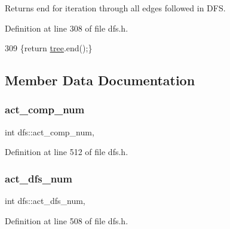 \begin{DoxyReturn}{Returns}
end for iteration through all edges followed in D\+FS. 
\end{DoxyReturn}


Definition at line 308 of file dfs.\+h.


\begin{DoxyCode}
309     \{\textcolor{keywordflow}{return} \mbox{\hyperlink{classdfs_aed496b618a937723bfec0b463e17e8d5}{tree}}.end();\}
\end{DoxyCode}


\subsection{Member Data Documentation}
\mbox{\label{classdfs_ab0251ac30adfd569e214a64db7f3a905}} 
\subsubsection{\texorpdfstring{act\+\_\+comp\+\_\+num}{act\_comp\_num}}
{\footnotesize\ttfamily int dfs\+::act\+\_\+comp\+\_\+num\hspace{0.3cm}{\ttfamily [protected]}, {\ttfamily [inherited]}}



Definition at line 512 of file dfs.\+h.

\mbox{\label{classdfs_aedaf2b485ff83150b1de6c305922473b}} 
\subsubsection{\texorpdfstring{act\+\_\+dfs\+\_\+num}{act\_dfs\_num}}
{\footnotesize\ttfamily int dfs\+::act\+\_\+dfs\+\_\+num\hspace{0.3cm}{\ttfamily [protected]}, {\ttfamily [inherited]}}



Definition at line 508 of file dfs.\+h.

\mbox{\label{classdfs_a1dc18a7df8d6b238d5301c92fc7540fa}} 
